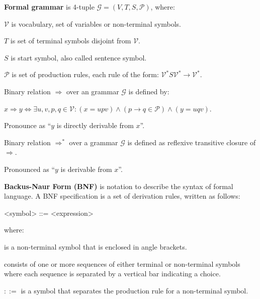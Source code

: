 \documentclass[a4paper,10pt]{article}
\begin{document}
\begin{terms}
\newpage

    \item \textbf{Formal grammar} is 4-tuple $\mathcal{G} = (V, T, S, \mathcal{P})$, where:

    \begin{terms}
        \item $\mathcal{V}$ is vocabulary, set of variables or non-terminal symbols.

        \item $T$ is set of terminal symbols disjoint from $\mathcal{V}$.

        \item $S$ is start symbol, also called sentence symbol.

        \item $\mathcal{P}$ is set of production rules, each rule of the form:
        $\mathcal{V}^*S\mathcal{V}^* \xrightarrow{} \mathcal{V}^*$.
    \end{terms}

    \item Binary relation $\mathbf{\Rightarrow}$ over an grammar $\mathcal{G}$ is defined by:

    $x \Rightarrow y \Longleftrightarrow \exists u,v,p,q \in \mathcal{V}: (x = upv) \land (p \rightarrow{} q \in \mathcal{P}) \land (y = uqv)$.

    Pronounce as \enquote{$y$ is directly derivable from $x$}.

    \item Binary relation $\mathbf{\Rightarrow^*}$ over a grammar $\mathcal{G}$ is defined as reflexive transitive closure of $\Rightarrow$.

    Pronounced as \enquote{$y$ is derivable from $x$}.

    \item \textbf{Backus-Naur Form (BNF)} is notation to describe the syntax of formal language.
    A BNF specification is a set of derivation rules, written as follows:
    \setlength{\grammarparsep}{0pt plus 4pt}
    \setlength{\grammarindent}{6em}
    \begin{grammar}
        <symbol> ::= <expression>
    \end{grammar}
    where:
    \begin{terms}
        \item {} is a non-terminal symbol that is enclosed in angle brackets.

        \item {} consists of one or more sequences of either terminal or non-terminal symbols where each sequence is separated by a vertical bar indicating a choice.

        \item $::=$ is a symbol that separates the production rule for a non-terminal symbol.
    \end{terms}



\end{terms}
\end{document}
